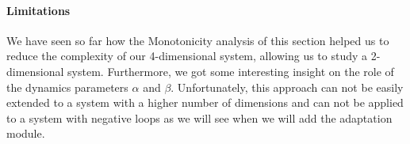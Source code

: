 \paragraph{Limitations} We have seen so far how the Monotonicity analysis of this section helped us to reduce the complexity of our 4-dimensional system, allowing us to study a 2-dimensional system. Furthermore, we got some interesting insight on the role of the dynamics parameters $\alpha$ and $\beta$. Unfortunately, this approach can not be easily extended to a system with a higher number of dimensions and can not be applied to a system with negative loops as we will see when we will add the adaptation module.